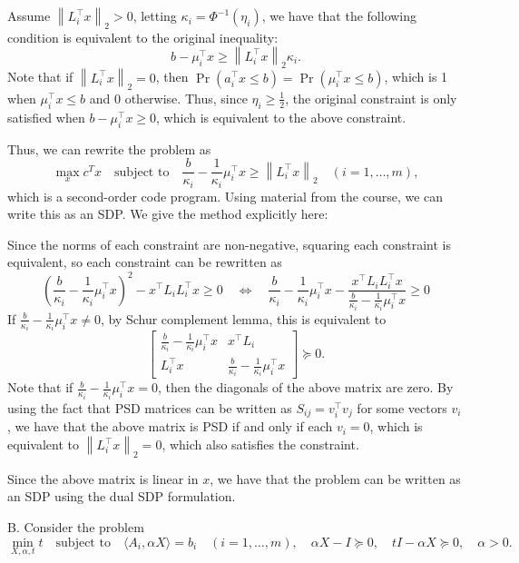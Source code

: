 \documentclass[11pt,letterpaper]{article}
\theoremstyle{definition}
\begin{document}
Assume $\left\|L_i^\top x\right\|_2 > 0$, letting $\kappa_i = \Phi^{-1}(\eta_i)$, we have that the following condition is equivalent to the original inequality:
\[
    b-\mu_i^\top x \geq \left\|L_i^\top x\right\|_2 \kappa_i.
\]
Note that if $\left\|L_i^\top x\right\|_2 = 0$, then $\Pr(a^\top_i x\leq b) = \Pr(\mu^\top_i x\leq b)$, which is 1 when $\mu^\top_i x \leq b$ and 0 otherwise. 
Thus, since $\eta_i\geq \frac{1}{2}$, the original constraint is only satisfied when $b-\mu^\top_i x\geq 0$, which is equivalent to the above constraint.

Thus, we can rewrite the problem as 
\[
\max_x c^T x \quad \text{subject to} \quad \frac{b}{\kappa_i} -\frac{1}{\kappa_i}\mu_i^\top x \geq \left\|L_i^\top x\right\|_2 \quad (i = 1, \ldots, m),
\]
which is a second-order code program. Using material from the course, we can write this as an SDP.
We give the method explicitly here:

Since the norms of each constraint are non-negative, squaring each constraint is equivalent, so each constraint can be rewritten as
\[
 \left(\frac{b}{\kappa_i} -\frac{1}{\kappa_i}\mu_i^\top x\right)^2  - x^\top L_i L_i^\top x \geq 0 \quad \Leftrightarrow \quad \frac{b}{\kappa_i} -\frac{1}{\kappa_i}\mu_i^\top x - \frac{x^\top L_i L_i^\top x}{\frac{b}{\kappa_i} -\frac{1}{\kappa_i}\mu_i^\top x} \geq 0
 \]
If $\frac{b}{\kappa_i} -\frac{1}{\kappa_i}\mu_i^\top x \neq 0$, by Schur complement lemma, this is equivalent to
\[
\begin{bmatrix}
\frac{b}{\kappa_i} -\frac{1}{\kappa_i}\mu_i^\top x & x^\top L_i \\
L_i^\top x & \frac{b}{\kappa_i} -\frac{1}{\kappa_i}\mu_i^\top x
\end{bmatrix} \succeq 0.
\]
Note that if $\frac{b}{\kappa_i} -\frac{1}{\kappa_i}\mu_i^\top x = 0$, then the diagonals of the above matrix are zero.
By using the fact that PSD matrices can be written as $S_{ij} = v_i^\top v_j$ for some vectors $v_i$, we have that the above matrix is PSD if and only if each $v_i = 0$, which is equivalent to $\left\|L_i^\top x\right\|_2 = 0$, which also satisfies the constraint.

Since the above matrix is linear in $x$, we have that the problem can be written as an SDP using the dual SDP formulation.

\bigskip

B.
Consider the problem
\[
\min_{X, \alpha, t} t \quad \text{subject to} \quad \langle A_i, \alpha X \rangle = b_i \quad (i = 1, \ldots, m), \quad \alpha X - I \succeq 0, \quad t I - \alpha X \succeq 0, \quad \alpha > 0.
\]
\end{document}
